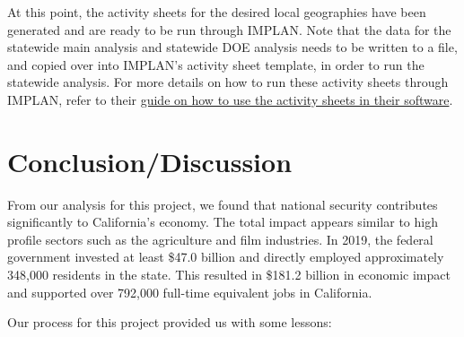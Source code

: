 \documentclass[
]{book}
\begin{document}
At this point, the activity sheets for the desired local geographies have been generated and are ready to be run through IMPLAN. Note that the data for the statewide main analysis and statewide DOE analysis needs to be written to a file, and copied over into IMPLAN's activity sheet template, in order to run the statewide analysis. For more details on how to run these activity sheets through IMPLAN, refer to their \href{https://support.implan.com/hc/en-us/articles/360040713754-Using-the-Event-Template}{guide on how to use the activity sheets in their software}.

\hypertarget{conclusion}{%
\chapter{Conclusion/Discussion}\label{conclusion}}

From our analysis for this project, we found that national security contributes significantly to California's economy. The total impact appears similar to high profile sectors such as the agriculture and film industries. In 2019, the federal government invested at least \$47.0 billion and directly employed approximately 348,000 residents in the state. This resulted in \$181.2 billion in economic impact and supported over 792,000 full-time equivalent jobs in California.

Our process for this project provided us with some lessons:
\end{document}
